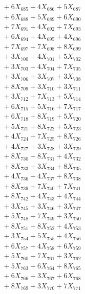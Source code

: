 \documentclass[a4paper,10pt]{article}
\begin{document}
{\begin{align}
&\;  + 6 X_{685} + 4 X_{686} + 5 X_{687} \\[0.3ex]
&\;  + 6 X_{688} + 5 X_{689} + 6 X_{690} \\[0.3ex]
&\;  + 7 X_{691} + 4 X_{692} + 7 X_{693} \\[0.3ex]
&\;  + 6 X_{694} + 4 X_{695} + 4 X_{696} \\[0.3ex]
&\;  + 7 X_{697} + 7 X_{698} + 8 X_{699} \\[0.5ex]\allowbreak
&\;  + 3 X_{700} + 4 X_{701} + 5 X_{702} \\[0.3ex]
&\;  + 3 X_{703} + 4 X_{704} + 7 X_{705} \\[0.3ex]
&\;  + 3 X_{706} + 3 X_{707} + 3 X_{708} \\[0.3ex]
&\;  + 8 X_{709} + 3 X_{710} + 3 X_{711} \\[0.3ex]
&\;  + 3 X_{712} + 7 X_{713} + 5 X_{714} \\[0.3ex]
&\;  + 6 X_{715} + 5 X_{716} + 7 X_{717} \\[0.3ex]
&\;  + 6 X_{718} + 8 X_{719} + 5 X_{720} \\[0.3ex]
&\;  + 5 X_{721} + 8 X_{722} + 5 X_{723} \\[0.3ex]
&\;  + 4 X_{724} + 7 X_{725} + 8 X_{726} \\[0.3ex]
&\;  + 4 X_{727} + 3 X_{728} + 3 X_{729} \\[0.5ex]\allowbreak
&\;  + 8 X_{730} + 8 X_{731} + 4 X_{732} \\[0.3ex]
&\;  + 8 X_{733} + 3 X_{734} + 8 X_{735} \\[0.3ex]
&\;  + 4 X_{736} + 4 X_{737} + 8 X_{738} \\[0.3ex]
&\;  + 8 X_{739} + 7 X_{740} + 7 X_{741} \\[0.3ex]
&\;  + 8 X_{742} + 4 X_{743} + 4 X_{744} \\[0.3ex]
&\;  + 3 X_{745} + 3 X_{746} + 3 X_{747} \\[0.3ex]
&\;  + 5 X_{748} + 7 X_{749} + 3 X_{750} \\[0.3ex]
&\;  + 8 X_{751} + 8 X_{752} + 4 X_{753} \\[0.3ex]
&\;  + 3 X_{754} + 5 X_{755} + 4 X_{756} \\[0.3ex]
&\;  + 6 X_{757} + 4 X_{758} + 6 X_{759} \\[0.5ex]\allowbreak
&\;  + 5 X_{760} + 7 X_{761} + 3 X_{762} \\[0.3ex]
&\;  + 5 X_{763} + 6 X_{764} + 8 X_{765} \\[0.3ex]
&\;  + 6 X_{766} + 3 X_{767} + 6 X_{768} \\[0.3ex]
&\;  + 8 X_{769} + 3 X_{770} + 7 X_{771} \\[0.3ex]

\end{align}}
\end{document}
